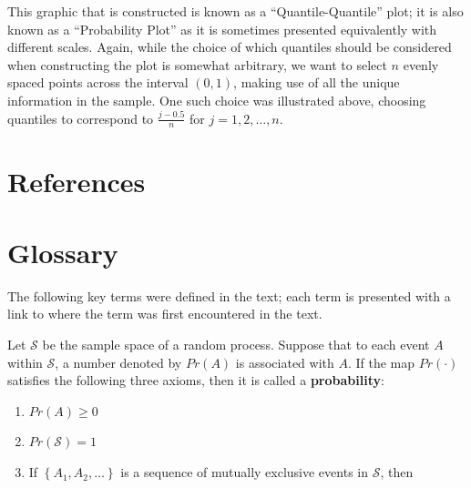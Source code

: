 \documentclass[
  letterpaper,
  DIV=11,
  numbers=noendperiod]{scrreprt}
\providecommand{\tightlist}{%
  \setlength{\itemsep}{0pt}\setlength{\parskip}{0pt}}\usepackage{longtable,booktabs,array}
\newlength{\cslhangindent}
\newlength{\cslentryspacingunit} %
\newenvironment{CSLReferences}[2] %
 {%
  \setlength{\parindent}{0pt}
  \ifodd #1
  \let\oldpar\par
  \def\par{\hangindent=\cslhangindent\oldpar}
  \fi
  \setlength{\parskip}{#2\cslentryspacingunit}
 }%
 {}
\theoremstyle{definition}
\theoremstyle{definition}
\theoremstyle{plain}
\theoremstyle{remark}
\begin{document}
This graphic that is constructed is known as a ``Quantile-Quantile''
plot; it is also known as a ``Probability Plot'' as it is sometimes
presented equivalently with different scales. Again, while the choice of
which quantiles should be considered when constructing the plot is
somewhat arbitrary, we want to select \(n\) evenly spaced points across
the interval \((0, 1)\), making use of all the unique information in the
sample. One such choice was illustrated above, choosing quantiles to
correspond to \(\frac{j - 0.5}{n}\) for \(j = 1,2,\dotsc,n\).


\hypertarget{references}{%
\chapter*{References}\label{references}}


\hypertarget{refs}{}
\begin{CSLReferences}{0}{0}
\end{CSLReferences}

\cleardoublepage
{}
{}
\appendix

\hypertarget{glossary}{%
\chapter{Glossary}\label{glossary}}

The following key terms were defined in the text; each term is presented
with a link to where the term was first encountered in the text.

\begin{description}
\tightlist
\item[Axioms of Probability (Definition~\ref{def-axioms})]
Let \(\mathcal{S}\) be the sample space of a random process. Suppose
that to each event \(A\) within \(\mathcal{S}\), a number denoted by
\(Pr(A)\) is associated with \(A\). If the map \(Pr(\cdot)\) satisfies
the following three axioms, then it is called a \textbf{probability}:
\end{description}

\begin{enumerate}
\def\labelenumi{\arabic{enumi}.}
\tightlist
\item
  \(Pr(A) \geq 0\)
\item
  \(Pr(\mathcal{S}) = 1\)
\item
  If \(\left\{A_1, A_2, \dotsc\right\}\) is a sequence of mutually
  exclusive events in \(\mathcal{S}\), then
\end{enumerate}
\end{document}
